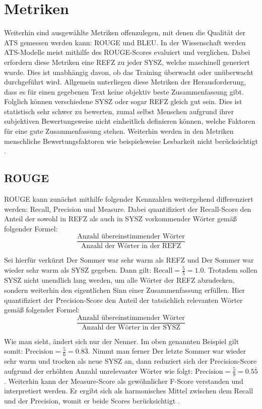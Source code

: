 \section{Metriken}
\noindent
Weiterhin sind ausgewählte Metriken offenzulegen, mit denen die Qualität der \ac{ATS} gemessen werden kann: \ac{ROUGE} und \ac{BLEU}. In der Wissenschaft werden \ac{ATS}-Modelle meist mithilfe des \ac{ROUGE}-Scores evaluiert und verglichen. Dabei erfordern diese Metriken eine \ac{REFZ} zu jeder \ac{SYSZ}, welche maschinell generiert wurde. Dies ist unabhängig davon, ob das Training überwacht oder unüberwacht durchgeführt wird. Allgemein unterliegen diese Metriken der Herausforderung, dass es für einen gegebenen Text keine objektiv beste Zusammenfassung gibt. Folglich können verschiedene \ac{SYSZ} oder sogar \ac{REFZ} gleich gut sein. Dies ist statistisch sehr schwer zu bewerten, zumal selbst Menschen aufgrund ihrer subjektiven Bewertungsweise nicht einheitlich definieren können, welche Faktoren für eine gute Zusammenfassung stehen. Weiterhin werden in den Metriken menschliche Bewertungsfaktoren wie beispielsweise Lesbarkeit nicht berücksichtigt \cite{LEM20}.


\subsection{ROUGE}
\noindent
\ac{ROUGE} kann zunächst mithilfe folgender Kennzahlen weitergehend differenziert werden: Recall, Precision und Measure. Dabei quantifiziert der Recall-Score den Anteil der sowohl in \ac{REFZ} als auch in \ac{SYSZ} vorkommender Wörter gemäß folgender Formel:\\
$$\frac{\text{Anzahl übereinstimmender Wörter}}{\text{Anzahl der Wörter in der REFZ}}$$ \newline

\noindent
Sei hierfür verkürzt \glqq Der Sommer war sehr warm\grqq{} als \ac{REFZ} und \glqq Der Sommer war wieder sehr warm\grqq{} als \ac{SYSZ} gegeben. Dann gilt: $\text{Recall} = \frac{5}{5} = 1.0$. Trotzdem sollen \ac{SYSZ} nicht unendlich lang werden, um alle Wörter der \ac{REFZ} abzudecken, sondern weiterhin den eigentlichen Sinn einer Zusammenfassung erfüllen. Hier quantifiziert der Precision-Score den Anteil der tatsächlich relevanten Wörter gemäß folgender Formel:\\
$$\frac{\text{Anzahl übereinstimmender Wörter}}{\text{Anzahl der Wörter in der SYSZ}}$$ \newline

\noindent
Wie man sieht, ändert sich nur der Nenner. Im oben genannten Beispiel gilt somit: $\text{Precision} = \frac{5}{6} = 0.8\overline{3}$. Nimmt man ferner \glqq Der letzte Sommer war wieder sehr warm und trocken\grqq{} als neue \ac{SYSZ} an, dann reduziert sich der Precision-Score aufgrund der erhöhten Anzahl unrelevanter Wörter wie folgt: $\text{Precision} = \frac{5}{9} = 0.5\overline{5}$. Weiterhin kann der Measure-Score als gewöhnlicher F-Score verstanden und interpretiert werden. Er ergibt sich als harmonisches Mittel zwischen dem Recall und der Precision, womit er beide Scores berücksichtigt \cite[S.~1-3]{LIN04}.\\

